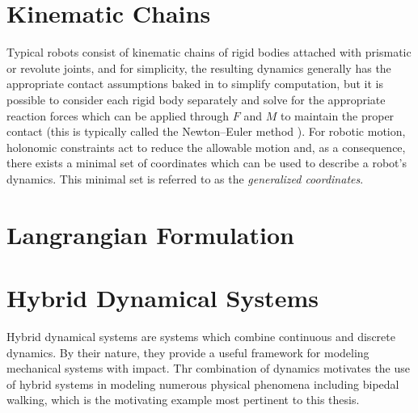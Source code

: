 \section{Kinematic Chains}

Typical robots consist of kinematic chains of rigid bodies attached with prismatic or revolute joints, and for simplicity, the resulting dynamics generally has the appropriate contact assumptions baked in to simplify computation, but it is possible to consider each rigid body separately and solve for the appropriate reaction forces which can be applied through $F$ and $M$ to maintain the proper contact (this is typically called the Newton--Euler method \cite{Hollerbach80}).
%
For robotic motion, holonomic constraints act to reduce the allowable motion and, as a consequence, there exists a minimal set of coordinates which can be used to describe a robot's dynamics.
%
This minimal set is referred to as the {\em generalized coordinates}.


\section{Langrangian Formulation}

%
%

\section{Hybrid Dynamical Systems}

Hybrid dynamical systems are systems which combine continuous and discrete dynamics.
%
By their nature, they provide a useful framework for modeling mechanical systems with impact.
%
Thr combination of dynamics motivates the use of hybrid systems in modeling numerous physical phenomena including bipedal walking, which is the motivating example most pertinent to this thesis.
%

